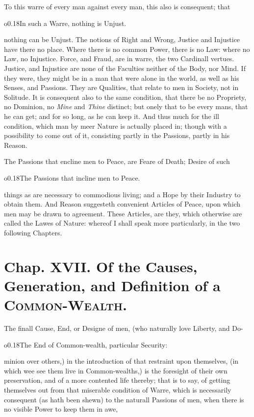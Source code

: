 To this warre of every man against every man, this also is consequent;
that \begin{wrapfigure}[4]{o}{0.18\textwidth}\wrapadj In such a Warre,
nothing is Unjust. \end{wrapfigure} nothing can be Unjust. The notions
of Right and Wrong, Justice and Injustice have there no place. Where
there is no common Power, there is no Law: where no Law, no Injustice.
Force, and Fraud, are in warre, the two Cardinall vertues. Justice,
and Injustice are none of the Faculties neither of the Body, nor Mind.
If they were, they might be in a man that were alone in the world, as
well as his Senses, and Passions. They are Qualities, that relate to
men in Society, not in Solitude. It is consequent also to the same
condition, that there be no Propriety, no Dominion, no \textit{Mine}
and \textit{Thine} distinct; but onely that to be every mans, that he
can get; and for so long, as he can keep it. And thus much for the ill
condition, which man by meer Nature is actually  placed in;
though with a possibility to come out of it, consisting partly in the
Passions, partly in his Reason.

The Passions that encline men to Peace, are Feare of Death; Desire of
such \begin{wrapfigure}[4]{o}{0.18\textwidth}\wrapadj The Passions that
incline men to Peace. \end{wrapfigure} things as are necessary to
commodious living; and a Hope by their Industry to obtain them. And
Reason suggesteth convenient Articles of Peace, upon which men may be
drawn to agreement. These Articles, are they, which otherwise are
called the Lawes of Nature: whereof I shall speak more particularly,
in the two following Chapters.


\section*{Chap. XVII. Of the Causes, Generation, and
Definition of a \textsc{Common-Wealth}.}

The finall Cause, End, or Designe of men, (who naturally love Liberty,
and Do- \begin{wrapfigure}[4]{o}{0.18\textwidth}\wrapadj The End of
Common-wealth, particular Security: \end{wrapfigure} minion over
others,) in the introduction of that restraint upon themselves, (in
which wee see them live in Common-wealths,) is the foresight of their
own preservation, and of a more contented life thereby; that is to
say, of getting themselves out from that miserable condition of Warre,
which is necessarily consequent (as hath been shewn) to the naturall
Passions of men, when there is no visible Power to keep them in awe,

